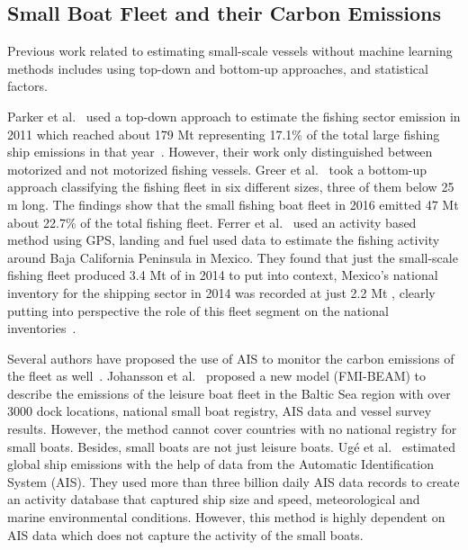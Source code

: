 
\subsection{Small Boat Fleet and their Carbon Emissions}
Previous work related to estimating small-scale vessels without machine learning methods includes using top-down and bottom-up approaches, and statistical factors. 

Parker et al.~\cite{parker2018fuel} used a top-down approach to estimate the fishing sector emission in 2011 which reached about 179 Mt  representing 17.1\% of the total large fishing ship emissions in that year~\cite{smith2015third}. However, their work only distinguished between motorized and not motorized fishing vessels. Greer et al.~\cite{GREER2019103382} took a bottom-up approach classifying the fishing fleet in six different sizes, three of them below 25 m long. The findings show that the small fishing boat fleet in 2016 emitted 47 Mt  about 22.7\% of the total fishing fleet. Ferrer et al.~\cite{ferrer2021mexican} used an activity based method using GPS, landing and fuel used data to estimate the fishing activity around Baja California Peninsula in Mexico. They found that just the small-scale fishing fleet produced 3.4 Mt of  in 2014 to put into context, Mexico’s national inventory for the shipping sector in 2014 was recorded at just 2.2 Mt , clearly putting into perspective the role of this fleet segment on the national inventories~\cite{inecc2020inventario}.

Several authors have proposed the use of AIS to monitor the carbon emissions of the fleet as well~\cite{Traut2013MonitoringSE, Johansson2016ACM, Mabunda2014EstimatingCD, Hensel2020GreenSU, Han2016RealtimeIA}. Johansson et al.~\cite{Johansson2018ModelingOL} proposed a new model (FMI-BEAM) to describe the emissions of the leisure boat fleet in the Baltic Sea region with over 3000 dock locations, national small boat registry, AIS data and vessel survey results. However, the method cannot cover countries with no national registry for small boats. Besides, small boats are not just leisure boats. Ug{\'e} et al.~\cite{Ug2020EstimationOW} estimated global ship emissions with the help of data from the Automatic Identification System (AIS). They used more than three billion daily AIS data records to create an activity database that captured ship size and speed, meteorological and marine environmental conditions. However, this method is highly dependent on AIS data which does not capture the activity of the small boats.

